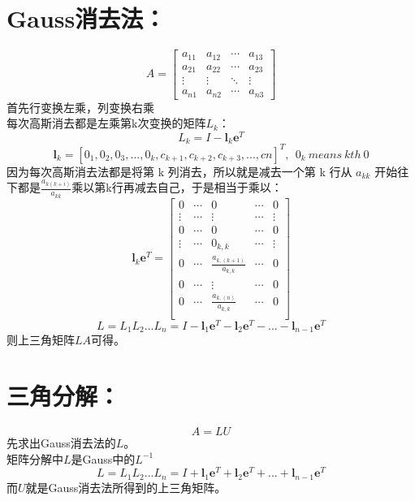 \documentclass[12pt]{article}
\begin{document}
\begin{CJK*}{UTF8}{gbsn}
\section{Gauss消去法：}
\begin{equation*}
	A=\begin{bmatrix}
	a_{11}&a_{12} &\cdots &a_{13} \\
	a_{21}&a_{22} &\cdots &a_{23} \\
	\vdots  &\vdots &\ddots &\vdots \\
	a_{n1}&a_{n2}&\cdots &a_{n3}
\end{bmatrix}
\end{equation*}
首先行变换左乘，列变换右乘\\
每次高斯消去都是左乘第k次变换的矩阵$L_k$：
\begin{equation}
	L_k=I-\bm l_k\bm e^T
\end{equation}
\begin{equation}
	\bm l_k=[0_1,0_2,0_3,...,0_{k},c_{k+1},c_{k+2},c_{k+3},...,c{n}]^T,~~0_k~means~kth~0
\end{equation}
因为每次高斯消去法都是将第 k 列消去，所以就是减去一个第 k 行从 $a_{kk}$ 开始往下都是$\frac{a_{k(k+i)}}{a_{kk}}$乘以第k行再减去自己，于是相当于乘以：
\begin{equation}
	\bm l_k\bm e^T=\begin{bmatrix}
	0&\cdots & 0 &\cdots & 0\\
	\vdots &\cdots & \vdots &\cdots & \vdots\\
	0&\cdots & 0&\cdots & 0\\
	\vdots &\cdots &0_{k,k}&\cdots & \vdots\\
	0 &\cdots &\frac{a_{k,(k+1)}}{a_{k,k}}&\cdots & 0\\
	0 &\cdots &\vdots &\cdots & 0\\
	0 &\cdots &\frac{a_{k,(n)}}{a_{k,k}}&\cdots & 0\\
\end{bmatrix}
\end{equation}
\begin{equation}
	L=L_1L_2...L_n=I-\bm l_1\bm e^T-\bm l_2\bm e^T-...-\bm l_{n-1}\bm e^T
\end{equation}
则上三角矩阵$LA$可得。
\section{三角分解：}
\begin{equation}
	A=LU
\end{equation}
先求出Gauss消去法的$L$。\\
矩阵分解中$L$是Gauss中的$L^{-1}$
\begin{equation}
	L=L_1L_2...L_n=I+\bm l_1\bm e^T+\bm l_2\bm e^T+...+\bm l_{n-1}\bm e^T
\end{equation}
而$U$就是Gauss消去法所得到的上三角矩阵。

\end{CJK*}
\end{document}
